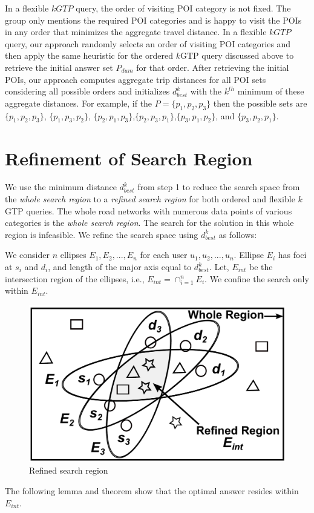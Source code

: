 In a flexible $kGTP$ query, the order of visiting POI category is not fixed. The group only mentions the required POI categories and is happy to visit the POIs in any order that minimizes the aggregate travel distance. In a flexible $kGTP$ query, our approach randomly selects an order of visiting POI categories and then apply the same heuristic for the ordered $k$GTP query discussed above to retrieve the initial answer set $P_{dum}$ for that order. After retrieving the initial POIs, our approach computes aggregate trip distances for all POI sets considering all possible orders and initializes $d_{best}^k$ with the $k^{th}$ minimum of these aggregate distances. For example,  if the $P=\{p_1,p_2,p_3\}$ then the possible sets are $\{p_1,p_2,p_3\}$, $\{p_1,p_3,p_2\}$, $\{p_2,p_1,p_3\}$,$\{p_2,p_3,p_1\}$,$\{p_3,p_1,p_2\}$, and $\{p_3,p_2,p_1\}$.

\section{Refinement of Search Region}
\label{sec:step2}

We use the minimum distance $d_{best}^k$ from step 1 to reduce the search space from the \textit{whole search region} to a \textit{refined search region} for both ordered and flexible $k$GTP queries. The whole road networks with numerous data points of various categories is the \textit{whole search region}. The search for the solution in this whole region is infeasible. We refine the search space using $d_{best}^k$ as follows:

We consider $n$ ellipses $E_1,E_2,...,E_n$  for each user $u_1,u_2,...,u_n$. Ellipse $E_i$ has foci at $s_i$ and $d_i$, and length of the major axis equal to $d_{best}^k$. Let, $E_{int}$ be the intersection region of the ellipses, i.e., $E_{int} = \cap_{i=1}^n E_i$. We confine the search only within $E_{int}$.


\begin{figure}[!htbp]
\centering
\includegraphics[width=0.6\columnwidth]{figures/soln1/proof.pdf}
\caption{Refined search region}
\label{fig:proof}
\end{figure}
The following lemma and theorem show that the optimal answer resides within $E_{int}$.\\

